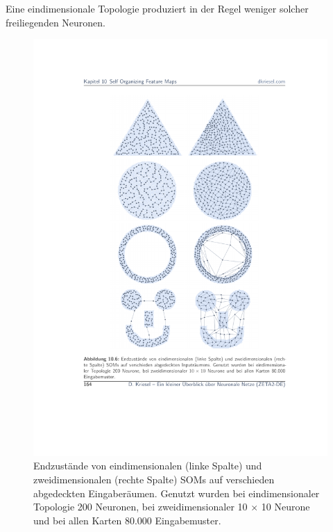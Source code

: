 Eine eindimensionale Topologie produziert in der Regel weniger solcher freiliegenden Neuronen.

\begin{figure}[ht!] \centering 
	\includegraphics[width=\linewidth]{figures/ch08_som-endzustaende.pdf}
	\caption{Endzustände von eindimensionalen (linke Spalte) und zweidimensionalen (rechte Spalte) SOMs auf verschieden abgedeckten Eingaberäumen. Genutzt wurden bei eindimensionaler Topologie 200 Neuronen, bei zweidimensionaler 10 $\times$ 10 Neurone und bei allen Karten 80.000 Eingabemuster.}
	\label{fig:ch08_som-endzustaende}
\end{figure}

